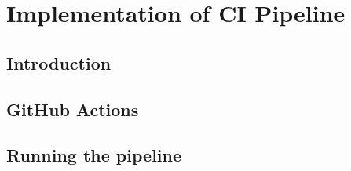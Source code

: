 \chapter{Implementation of CI Pipeline} \label{ci_pipeline}
\section{Introduction}
\section{GitHub Actions}
\section{Running the pipeline}
